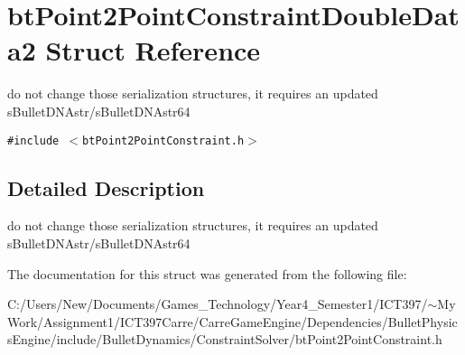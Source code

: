 \hypertarget{structbt_point2_point_constraint_double_data2}{
\section{btPoint2PointConstraintDoubleData2 Struct Reference}
\label{structbt_point2_point_constraint_double_data2}
}
do not change those serialization structures, it requires an updated sBulletDNAstr/sBulletDNAstr64  


{\tt \#include $<$btPoint2PointConstraint.h$>$}



\subsection{Detailed Description}
do not change those serialization structures, it requires an updated sBulletDNAstr/sBulletDNAstr64 

The documentation for this struct was generated from the following file:\begin{CompactItemize}
\item 
C:/Users/New/Documents/Games\_\-Technology/Year4\_\-Semester1/ICT397/$\sim$My Work/Assignment1/ICT397Carre/CarreGameEngine/Dependencies/BulletPhysicsEngine/include/BulletDynamics/ConstraintSolver/btPoint2PointConstraint.h\end{CompactItemize}
